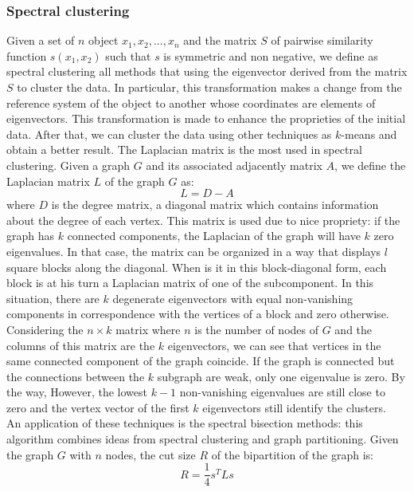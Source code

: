 \subsubsection{Spectral clustering}
Given a set of $n$ object $x_1 ,x_2, ..., x_n$ and the matrix $S$ of pairwise similarity function $s(x_1, x_2)$ such that $s$ is symmetric and non negative, we define as spectral clustering all methods that using the eigenvector derived from the matrix $S$ to cluster the data.
In particular, this transformation makes a change from the reference system of the object to another whose coordinates are elements of eigenvectors. This transformation is made to enhance the proprieties of the initial data.  After that, we can cluster the data using other techniques as $k$-means and obtain a better result. The Laplacian matrix is the most used in spectral clustering. Given a graph $G$ and its associated adjacently matrix $A$, we define the Laplacian matrix $L$ of the graph $G$ as:
\begin{equation}
L = D - A 
\end{equation}
where $D$ is the degree matrix, a diagonal matrix which contains information about the degree of each vertex. This matrix is used due to nice propriety: if the graph has $k$ connected components, the Laplacian of the graph will have $k$ zero eigenvalues.
In that case, the matrix can be organized in a way that displays $l$ square blocks along
the diagonal. When is it in this block-diagonal form, each block is at his turn a Laplacian matrix of one of the subcomponent.
In this situation,
there are $k$ degenerate eigenvectors with equal non-vanishing components in correspondence with the vertices of a block and zero otherwise. 
Considering the $n\times k$ matrix where $n$ is the number of nodes of $G$ and the columns of this matrix are the $k$ eigenvectors, we can see that vertices in the same connected component of the graph coincide.
If the graph is connected but the connections between the $k$ subgraph are weak, only one eigenvalue is zero. By the way, However, the lowest $k - 1$ non-vanishing eigenvalues are still close to zero and the vertex vector of the first $k$ eigenvectors still identify the clusters.\\
An application of these techniques is the spectral bisection methods: this algorithm combines ideas from spectral clustering and graph partitioning. 
Given the graph $G$ with $n$ nodes, the cut size $R$ of the bipartition of the graph is:
\begin{equation}\label{spec_bi_pa}
R = \frac{1}{4} s^TLs
\end{equation} 
